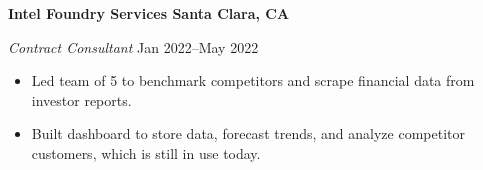 \textbf{Intel Foundry Services \hfill Santa Clara, CA}\par
\textit{Contract Consultant} \hfill Jan 2022--May 2022
\begin{itemize}
	\item Led team of 5 to benchmark competitors and scrape financial data from investor reports.
	\item Built dashboard to store data, forecast trends, and analyze competitor customers, which is still in use today.
\end{itemize}\par